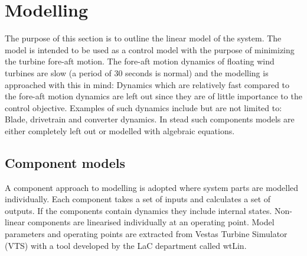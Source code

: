 \section{Modelling} \label{sec:mod} %
The purpose of this section is to outline the linear model of the system. The model is intended to be used as a control model with the purpose of minimizing the turbine fore-aft motion. The fore-aft motion dynamics of floating wind turbines are slow (a period of 30 seconds is normal) and the modelling is approached with this in mind: Dynamics which are relatively fast compared to the fore-aft motion dynamics are left out since they are of little importance to the control objective. Examples of such dynamics include but are not limited to: Blade, drivetrain and converter dynamics. In stead such components models are either completely left out or modelled with algebraic equations. 




%
%

\subsection{Component models}
A component approach to modelling is adopted where system parts are modelled individually. Each component takes a set of inputs and calculates a set of outputs. If the components contain dynamics they include internal states. Non-linear components are linearised individually at an operating point. Model parameters and operating points are extracted from Vestas Turbine Simulator (VTS) with a tool developed by the LaC department called wtLin.

